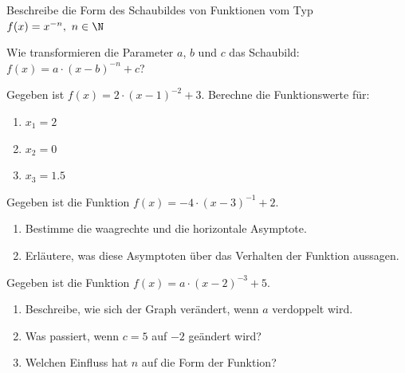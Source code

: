 
\begin{Exercise}[title={}, label=HyperbelA1]
	
Beschreibe die Form des Schaubildes von Funktionen vom Typ \(f(x)=x^{-n},\ n\in\N\) 

Wie transformieren die Parameter \( a \), \( b \) und \( c \) das Schaubild: \( f(x) = a \cdot (x - b)^{-n} + c \)?  
\end{Exercise}

\begin{Exercise}[title={}, label=HyperbelA2]
	
Gegeben ist \( f(x) = 2 \cdot (x - 1)^{-2} + 3 \). Berechne die Funktionswerte für:  
\begin{enumerate}[label=\alph*)]
	\item \( x_1 = 2 \) 
	\item \( x_2 = 0 \)  
	\item \( x_3 = 1.5 \)
\end{enumerate}
\end{Exercise}  

\begin{Exercise}[title={}, label=HyperbelA3]
	
Gegeben ist die Funktion \( f(x) = -4 \cdot (x - 3)^{-1} + 2 \).  
\begin{enumerate}[label=\alph*)]
	\item Bestimme die waagrechte und die horizontale Asymptote.
	\item Erläutere, was diese Asymptoten über das Verhalten der Funktion aussagen. 
\end{enumerate}
\end{Exercise}

\begin{Exercise}[title={}, label=HyperbelA4]
	
Gegeben ist die Funktion \( f(x) = a \cdot (x - 2)^{-3} + 5 \).  
\begin{enumerate}[label=\alph*)]
	\item Beschreibe, wie sich der Graph verändert, wenn \( a \) verdoppelt wird.  
	\item Was passiert, wenn \( c=5 \) auf \( -2 \) geändert wird? 
	\item Welchen Einfluss hat \( n \) auf die Form der Funktion?
\end{enumerate}
\end{Exercise}  

